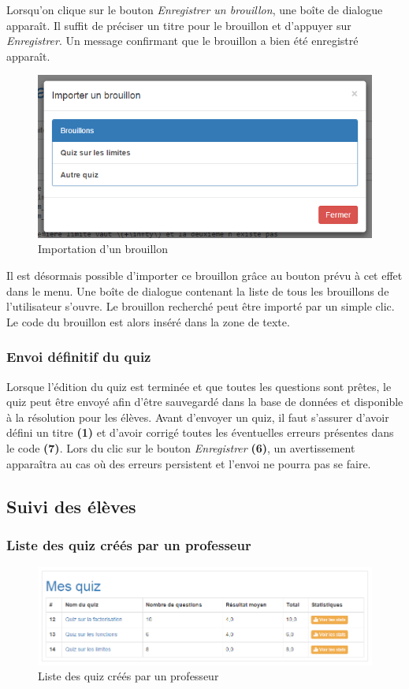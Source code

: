 \documentclass[a4,10pt,french]{sphinxmanual}
\begin{document}
Lorsqu'on clique sur le bouton \emph{Enregistrer un brouillon}, une boîte de dialogue apparaît. Il suffit de préciser un titre pour le brouillon et d'appuyer sur \emph{Enregistrer}. Un message confirmant que le brouillon a bien été enregistré apparaît.
\begin{figure}[htbp]
\centering
\capstart

\includegraphics[width=0.700\linewidth]{draft-import.png}
\caption{Importation d'un brouillon}\end{figure}

Il est désormais possible d'importer ce brouillon grâce au bouton prévu à cet effet dans le menu. Une boîte de dialogue contenant la liste de tous les brouillons de l'utilisateur s'ouvre. Le brouillon recherché peut être importé par un simple clic. Le code du brouillon est alors inséré dans la zone de texte.


\subsubsection{Envoi définitif du quiz}
\label{doc-user:envoi-definitif-du-quiz}
Lorsque l'édition du quiz est terminée et que toutes les questions sont prêtes, le quiz peut être envoyé afin d'être sauvegardé dans la base de données et disponible à la résolution pour les élèves. Avant d'envoyer un quiz, il faut s'assurer d'avoir défini un titre \textbf{(1)} et d'avoir corrigé toutes les éventuelles erreurs présentes dans le code \textbf{(7)}. Lors du clic sur le bouton \emph{Enregistrer} \textbf{(6)}, un avertissement apparaîtra au cas où des erreurs persistent et l'envoi ne pourra pas se faire.


\subsection{Suivi des élèves}
\label{doc-user:suivi-des-eleves}

\subsubsection{Liste des quiz créés par un professeur}
\label{doc-user:liste-des-quiz-crees-par-un-professeur}\begin{figure}[htbp]
\centering
\capstart

\includegraphics[width=0.700\linewidth]{my-quiz.png}
\caption{Liste des quiz créés par un professeur}\end{figure}
\end{document}
